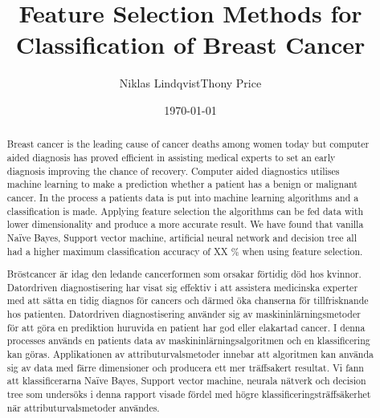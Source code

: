\documentclass{kththesis}
\title{Feature Selection Methods for Classification of Breast Cancer}
\author{Niklas Lindqvist\newline Thony Price}
\date{\today}
\begin{document}

\frontmatter
\titlepage



\begin{abstract}

  Breast cancer is the leading cause of cancer deaths among women today but computer aided diagnosis has proved efficient in assisting medical experts to set an early diagnosis improving the chance of recovery. Computer aided diagnostics utilises machine learning to make a prediction whether a patient has a benign or malignant cancer. In the process a patients data is put into machine learning algorithms and a classification is made. Applying feature selection the algorithms can be fed data with lower dimensionality and produce a more accurate result. We have found that vanilla Naïve Bayes, Support vector machine, artificial neural network and decision tree all had a higher maximum classification accuracy of XX \% when using feature selection.
\end{abstract}



\begin{otherlanguage}{swedish}
  \begin{abstract}

  Bröstcancer är idag den ledande cancerformen som orsakar förtidig död hos kvinnor. Datordriven diagnostisering har visat sig effektiv i att assistera medicinska experter med att sätta en tidig diagnos för cancers och därmed öka chanserna för tillfrisknande hos patienten. Datordriven diagnostisering använder sig av maskininlärningsmetoder för att göra en prediktion huruvida en patient har god eller elakartad cancer. I denna processes används en patients data av maskininlärningsalgoritmen och en klassificering kan göras. Applikationen av attributurvalsmetoder innebar att algoritmen kan använda sig av data med färre dimensioner och producera ett mer träffsakert resultat. Vi fann att klassificerarna Naïve Bayes, Support vector machine, neurala nätverk och decision tree som undersöks i denna rapport visade fördel med högre klassificeringsträffsäkerhet när attributurvalsmetoder användes.



  \end{abstract}

\end{otherlanguage}
\end{document}
